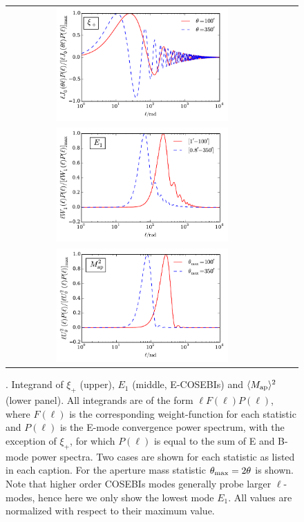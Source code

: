 \begin{figure}[!htp]
\begin{center}
\begin{tabular}{ccc}
\includegraphics[width=0.65\textwidth]{figures/IntegKsip.pdf} \\
\includegraphics[width=0.65\textwidth]{figures/IntegCOSEBIs.pdf} \\
\includegraphics[width=0.65\textwidth]{figures/IntegMap.pdf}\\
\end{tabular}
\caption{ \small{\label{fig:filters}. Integrand of $\xi_+$ (upper), $E_1$ (middle, E-COSEBIs) and $\langle M_{\rm ap} \rangle^2$ (lower panel).
All integrands are of the form $\ell F(\ell) P(\ell)$, where $F(\ell)$ is the corresponding weight-function
for each statistic and $P(\ell)$ is the E-mode convergence power spectrum, with the exception of $\xi_+$, for which
$P(\ell)$ is equal to the sum of E and B-mode power spectra. 
Two cases are shown for each statistic as listed in each caption.
For the aperture mass statistic $\theta_{\rm max}=2\theta$ is shown. 
Note that higher order COSEBIs modes generally probe larger $\ell$-modes, 
hence here we only show the lowest mode $E_1$. All values are normalized with respect to their maximum value. }
}
\end{center}
\end{figure}

